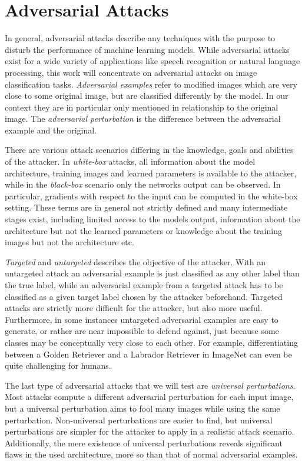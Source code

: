 
\section{Adversarial Attacks}
\label{sec:attacks}

In general, adversarial attacks describe any techniques with the purpose to disturb the performance of machine learning models.
While adversarial attacks exist for a wide variety of applications like speech recognition or natural language processing, this work will concentrate on adversarial attacks on image classification tasks.
\emph{Adversarial examples} refer to modified images which are very close to some original image, but are classified differently by the model.
In our context they are in particular only mentioned in relationship to the original image.
The \emph{adversarial perturbation} is the difference between the adversarial example and the original.

There are various attack scenarios differing in the knowledge, goals and abilities of the attacker.
In \emph{white-box} attacks, all information about the model architecture, training images and learned parameters is available to the attacker, while in the \emph{black-box} scenario only the networks output can be observed.
In particular, gradients with respect to the input can be computed in the white-box setting.
These terms are in general not strictly defined and many intermediate stages exist, including limited access to the models output, information about the architecture but not the learned parameters or knowledge about the training images but not the architecture etc.

\emph{Targeted} and \emph{untargeted} describes the objective of the attacker.
With an untargeted attack an adversarial example is just classified as any other label than the true label, while an adversarial example from a targeted attack has to be classified as a given target label chosen by the attacker beforehand.
Targeted attacks are strictly more difficult for the attacker, but also more useful.
Furthermore, in some instances untargeted adversarial examples are easy to generate, or rather are near impossible to defend against, just because some classes may be conceptually very close to each other.
For example, differentiating between a Golden Retriever and a Labrador Retriever in ImageNet \citep{imagenet} can even be quite challenging for humans.

The last type of adversarial attacks that we will test are \emph{universal perturbations}.
Most attacks compute a different adversarial perturbation for each input image, but a universal perturbation aims to fool many images while using the same perturbation.
Non-universal perturbations are easier to find, but universal perturbations are simpler for the attacker to apply in a realistic attack scenario.
Additionally, the mere existence of universal perturbations reveals significant flaws in the used architecture, more so than that of normal adversarial examples.

